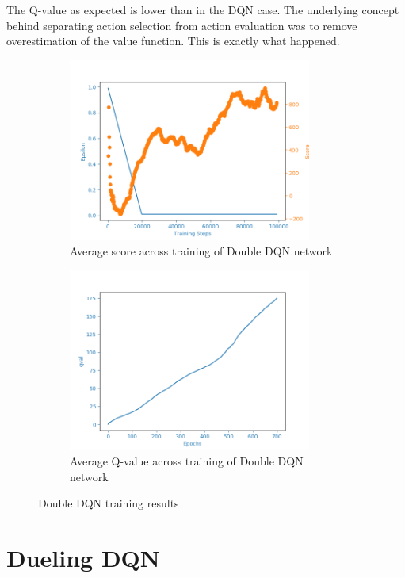 The Q-value as expected is lower than in the DQN case. The underlying concept behind separating action selection from action evaluation
was to remove overestimation of the value function. This is exactly what happened.

\begin{figure}[htb]
\begin{subfigure}{.48\textwidth}
    \centering
    \includegraphics[width=8cm]{img/DDQNAgent_WamvNavTwoSetsBuoys-v0_normal_1126_0854.png}
    \caption{Average score across training of Double DQN network}
    \label{fig:avg-score-ddqn}
\end{subfigure}
\begin{subfigure}{.48\textwidth}
    \centering
    \includegraphics[width=8cm]{img/DDQNAgent_WamvNavTwoSetsBuoys-v0_normal_1126_0854_qval.png}
    \caption{Average Q-value across training of Double DQN network}
\end{subfigure}
\caption{Double DQN training results}
\label{fig:ddqn-results}
\end{figure}

\newpage

\section{Dueling DQN}
\label{sec:results-dueling-dqn}

